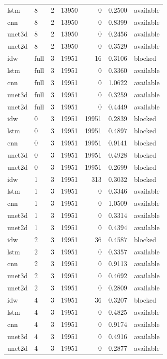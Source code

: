\begin{tabular}{llrrrrl}
lstm & 8 & 2 & 13950 & 0 & 0.2500 & available \\
cnn & 8 & 2 & 13950 & 0 & 0.8399 & available \\
unet3d & 8 & 2 & 13950 & 0 & 0.2456 & available \\
unet2d & 8 & 2 & 13950 & 0 & 0.3529 & available \\
idw & full & 3 & 19951 & 16 & 0.3106 & blocked \\
lstm & full & 3 & 19951 & 0 & 0.3360 & available \\
cnn & full & 3 & 19951 & 0 & 1.0622 & available \\
unet3d & full & 3 & 19951 & 0 & 0.3259 & available \\
unet2d & full & 3 & 19951 & 0 & 0.4449 & available \\
idw & 0 & 3 & 19951 & 19951 & 0.2839 & blocked \\
lstm & 0 & 3 & 19951 & 19951 & 0.4897 & blocked \\
cnn & 0 & 3 & 19951 & 19951 & 0.9141 & blocked \\
unet3d & 0 & 3 & 19951 & 19951 & 0.4928 & blocked \\
unet2d & 0 & 3 & 19951 & 19951 & 0.2699 & blocked \\
idw & 1 & 3 & 19951 & 313 & 0.3032 & blocked \\
lstm & 1 & 3 & 19951 & 0 & 0.3346 & available \\
cnn & 1 & 3 & 19951 & 0 & 1.0509 & available \\
unet3d & 1 & 3 & 19951 & 0 & 0.3314 & available \\
unet2d & 1 & 3 & 19951 & 0 & 0.4394 & available \\
idw & 2 & 3 & 19951 & 36 & 0.4587 & blocked \\
lstm & 2 & 3 & 19951 & 0 & 0.3357 & available \\
cnn & 2 & 3 & 19951 & 0 & 0.9113 & available \\
unet3d & 2 & 3 & 19951 & 0 & 0.4692 & available \\
unet2d & 2 & 3 & 19951 & 0 & 0.2809 & available \\
idw & 4 & 3 & 19951 & 36 & 0.3207 & blocked \\
lstm & 4 & 3 & 19951 & 0 & 0.4825 & available \\
cnn & 4 & 3 & 19951 & 0 & 0.9174 & available \\
unet3d & 4 & 3 & 19951 & 0 & 0.4916 & available \\
unet2d & 4 & 3 & 19951 & 0 & 0.2877 & available \\

\end{tabular}

